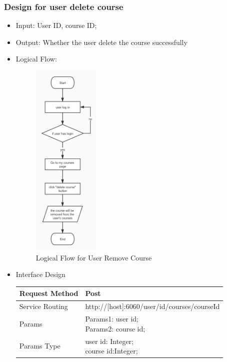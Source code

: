 \documentclass[16pt]{scrreprt}
\begin{document}
\subsubsection{Design for user delete course}
\begin{itemize}
    \item Input: User ID, course ID; 
    \item Output: Whether the user delete the course successfully
    \item Logical Flow:
     \begin{figure}[H]
    \centering
    \includegraphics[width=0.3\textwidth]{diagrams/user-remove-course.jpg}
    \caption{Logical Flow for User Remove Course}
\end{figure}
    \item Interface Design
    \begin{center}
    \begin{tabular}{p{5cm}p{10cm}}
        \hline
        Request Method & Post\\
        \hline
        Service Routing &  http://[host]:6060/user/{id}/courses/{courseId}\\
        \hline
        Params & \makecell[l]{Params1: user id;\\ Params2: course id;}\\ 
        \hline
        Params Type & \makecell[l]{user id: Integer;\\course id:Integer;}\\

\end{tabular}
\end{center}
\end{itemize}
\end{document}
